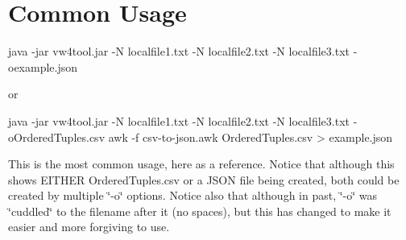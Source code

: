 \section*{Common Usage }

\begin{DoxyVerb}java -jar vw4tool.jar  -N localfile1.txt -N localfile2.txt -N localfile3.txt -oexample.json
\end{DoxyVerb}


or \begin{DoxyVerb}java -jar vw4tool.jar  -N localfile1.txt -N localfile2.txt -N localfile3.txt -oOrderedTuples.csv
awk -f csv-to-json.awk OrderedTuples.csv > example.json
\end{DoxyVerb}


This is the most common usage, here as a reference. Notice that although this shows E\+I\+T\+H\+E\+R Ordered\+Tuples.\+csv or a J\+S\+O\+N file being created, both could be created by multiple \char`\"{}-\/o\char`\"{} options. Notice also that although in past, \char`\"{}-\/o\char`\"{} was \char`\"{}cuddled\char`\"{} to the filename after it (no spaces), but this has changed to make it easier and more forgiving to use. 